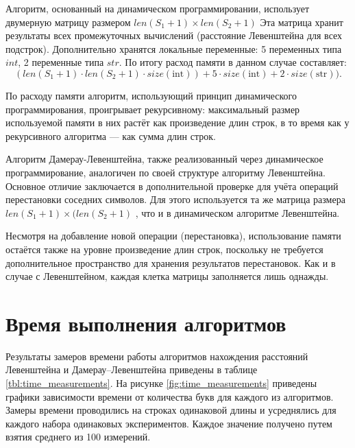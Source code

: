 Алгоритм, основанный на динамическом программировании, использует двумерную матрицу размером $len(S_{1} + 1) \times len(S_{2} + 1)$
Эта матрица хранит результаты всех промежуточных вычислений (расстояние Левенштейна для всех подстрок). Дополнительно хранятся локальные переменные: 5 переменных типа $int$, 2 переменные типа $str$. По итогу расход памяти в данном случае составляет:
\begin{equation}
	(len(S_{1} + 1) \cdot len(S_{2} + 1) \cdot size(\text{int})) + 5 \cdot size(\text{int}) + 2 \cdot size(\text{str})).
\end{equation}

По расходу памяти алгоритм, использующий принцип динамического программирования, проигрывает рекурсивному: максимальный размер используемой памяти в них растёт как произведение длин строк, в то время как у рекурсивного алгоритма — как сумма длин строк.

Алгоритм Дамерау-Левенштейна, также реализованный через динамическое программирование, аналогичен по своей структуре алгоритму Левенштейна. Основное отличие заключается в дополнительной проверке для учёта операций перестановки соседних символов. Для этого используется та же матрица размера 
$len(S_{1} + 1) \times (len(S_{2} + 1)$
, что и в динамическом алгоритме Левенштейна.

Несмотря на добавление новой операции (перестановка), использование памяти остаётся также на уровне 
произведение длин строк, поскольку не требуется дополнительное пространство для хранения результатов перестановок. Как и в случае с Левенштейном, каждая клетка матрицы заполняется лишь однажды.

\clearpage

\section{Время выполнения алгоритмов}
Результаты замеров времени работы алгоритмов нахождения расстояний Левенштейна и Дамерау–Левенштейна приведены в таблице \ref{tbl:time_measurements}. На рисунке \ref{fig:time_measurements} приведены графики зависимости времени от количества букв для каждого из алгоритмов. Замеры времени проводились на строках одинаковой длины и усреднялись для каждого набора одинаковых экспериментов. Каждое значение получено путем взятия среднего из 100 измерений.

